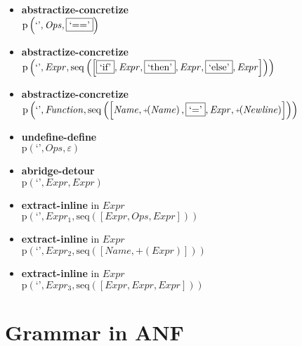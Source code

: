 {\begin{itemize}
\item \textbf{abstractize-concretize}\\$\mathrm{p}\left(\text{`'},\mathit{Ops},\fbox{$\text{`=='}$}\right)$
\item \textbf{abstractize-concretize}\\$\mathrm{p}\left(\text{`'},\mathit{Expr},\mathrm{seq}\left(\left[\fbox{$\text{`if'}$}, \mathit{Expr}, \fbox{$\text{`then'}$}, \mathit{Expr}, \fbox{$\text{`else'}$}, \mathit{Expr}\right]\right)\right)$
\item \textbf{abstractize-concretize}\\$\mathrm{p}\left(\text{`'},\mathit{Function},\mathrm{seq}\left(\left[\mathit{Name}, \plus \left(\mathit{Name}\right), \fbox{$\text{`='}$}, \mathit{Expr}, \plus \left(\mathit{Newline}\right)\right]\right)\right)$
\item \textbf{undefine-define}\\$\mathrm{p}\left(\text{`'},\mathit{Ops},\varepsilon\right)$
\item \textbf{abridge-detour}\\$\mathrm{p}\left(\text{`'},\mathit{Expr},\mathit{Expr}\right)$
\item \textbf{extract-inline}  in $\mathit{Expr}$\\$\mathrm{p}\left(\text{`'},\mathit{Expr_1},\mathrm{seq}\left(\left[\mathit{Expr}, \mathit{Ops}, \mathit{Expr}\right]\right)\right)$
\item \textbf{extract-inline}  in $\mathit{Expr}$\\$\mathrm{p}\left(\text{`'},\mathit{Expr_2},\mathrm{seq}\left(\left[\mathit{Name}, \plus \left(\mathit{Expr}\right)\right]\right)\right)$
\item \textbf{extract-inline}  in $\mathit{Expr}$\\$\mathrm{p}\left(\text{`'},\mathit{Expr_3},\mathrm{seq}\left(\left[\mathit{Expr}, \mathit{Expr}, \mathit{Expr}\right]\right)\right)$
\end{itemize}}

\section{Grammar in ANF}

